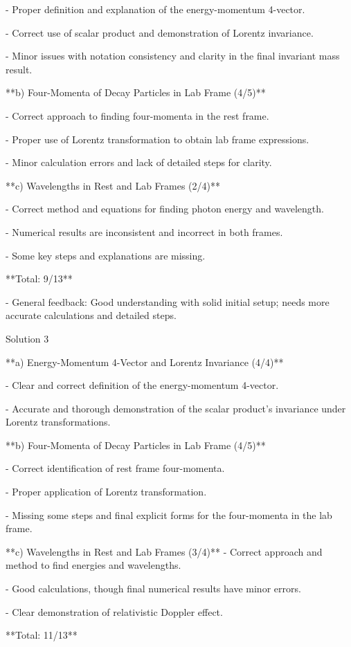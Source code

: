 \documentclass[a4paper,11pt]{article}
\begin{document}
- Proper definition and explanation of the energy-momentum 4-vector.

- Correct use of scalar product and demonstration of Lorentz invariance.

- Minor issues with notation consistency and clarity in the final invariant mass result.

**b) Four-Momenta of Decay Particles in Lab Frame (4/5)**

- Correct approach to finding four-momenta in the rest frame.

- Proper use of Lorentz transformation to obtain lab frame expressions.

- Minor calculation errors and lack of detailed steps for clarity.

**c) Wavelengths in Rest and Lab Frames (2/4)**

- Correct method and equations for finding photon energy and wavelength.

- Numerical results are inconsistent and incorrect in both frames.

- Some key steps and explanations are missing.

**Total: 9/13**

- General feedback: Good understanding with solid initial setup; needs more accurate calculations and detailed steps.

Solution 3

**a) Energy-Momentum 4-Vector and Lorentz Invariance (4/4)**

- Clear and correct definition of the energy-momentum 4-vector.

- Accurate and thorough demonstration of the scalar product's invariance under Lorentz transformations.

**b) Four-Momenta of Decay Particles in Lab Frame (4/5)**

- Correct identification of rest frame four-momenta.

- Proper application of Lorentz transformation.

- Missing some steps and final explicit forms for the four-momenta in the lab frame.

**c) Wavelengths in Rest and Lab Frames (3/4)**
- Correct approach and method to find energies and wavelengths.

- Good calculations, though final numerical results have minor errors.

- Clear demonstration of relativistic Doppler effect.

**Total: 11/13**
\end{document}
